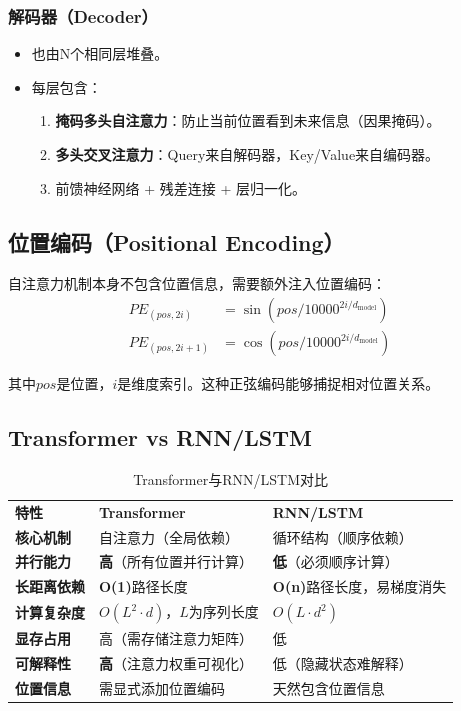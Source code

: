 \subsubsection{解码器（Decoder）}
\begin{itemize}
    \item 也由N个相同层堆叠。
    \item 每层包含：
    \begin{enumerate}
        \item \textbf{掩码多头自注意力}：防止当前位置看到未来信息（因果掩码）。
        \item \textbf{多头交叉注意力}：Query来自解码器，Key/Value来自编码器。
        \item 前馈神经网络 + 残差连接 + 层归一化。
    \end{enumerate}
\end{itemize}

\subsection{位置编码（Positional Encoding）}

自注意力机制本身不包含位置信息，需要额外注入位置编码：
\[
\begin{aligned}
PE_{(pos, 2i)} &= \sin(pos / 10000^{2i/d_{\text{model}}}) \\
PE_{(pos, 2i+1)} &= \cos(pos / 10000^{2i/d_{\text{model}}})
\end{aligned}
\]

其中$pos$是位置，$i$是维度索引。这种正弦编码能够捕捉相对位置关系。

\subsection{Transformer vs RNN/LSTM}

\begin{table}[h]
\centering
\caption{Transformer与RNN/LSTM对比}
\begin{tabular}{p{}p{}p{}}
\textbf{特性} & \textbf{Transformer} & \textbf{RNN/LSTM} \\
\textbf{核心机制} & 自注意力（全局依赖） & 循环结构（顺序依赖） \\
\textbf{并行能力} & \textbf{高}（所有位置并行计算） & \textbf{低}（必须顺序计算） \\
\textbf{长距离依赖} & \textbf{O(1)}路径长度 & \textbf{O(n)}路径长度，易梯度消失 \\
\textbf{计算复杂度} & $O(L^2 \cdot d)$，$L$为序列长度 & $O(L \cdot d^2)$ \\
\textbf{显存占用} & 高（需存储注意力矩阵） & 低 \\
\textbf{可解释性} & \textbf{高}（注意力权重可视化） & 低（隐藏状态难解释） \\
\textbf{位置信息} & 需显式添加位置编码 & 天然包含位置信息 \\
\end{tabular}
\end{table}

